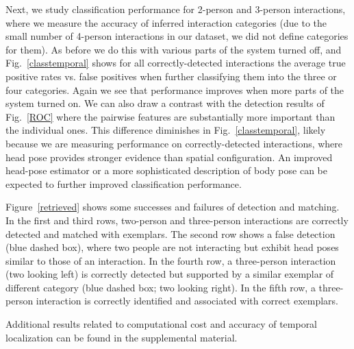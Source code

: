 Next, we study classification performance for 2-person and 3-person interactions, where we measure the accuracy of inferred interaction categories (due to the small number of 4-person interactions in our dataset, we did not define categories for them). As before we do this with various parts of the system turned off, and Fig.~\ref{classtemporal} shows for all correctly-detected interactions the average true positive rates vs. false positives when further classifying them into the three or four categories.  Again we see that performance improves when more parts of the system turned on. We can also draw a contrast with the detection results of Fig.~\ref{ROC} where the pairwise features are substantially more important than the individual ones. This difference diminishes in Fig.~\ref{classtemporal}, likely because we are measuring performance on correctly-detected interactions, where head pose provides stronger evidence than spatial configuration. An improved head-pose estimator or a more sophisticated description of body pose can be expected to further improved classification performance.

Figure~\ref{retrieved} shows some successes and failures of detection and matching. In the first and third rows,  two-person and three-person interactions are correctly detected and matched with exemplars. The second row shows a false detection (blue dashed box), where two people are not interacting but exhibit head poses similar to those of an interaction. In the fourth row, a three-person interaction (two looking left) is correctly detected but supported by a similar exemplar of different category (blue dashed box; two looking right). In the fifth row, a three-person interaction is correctly identified and associated with correct exemplars.

Additional results related to computational cost and accuracy of temporal localization can be found in the supplemental material.

